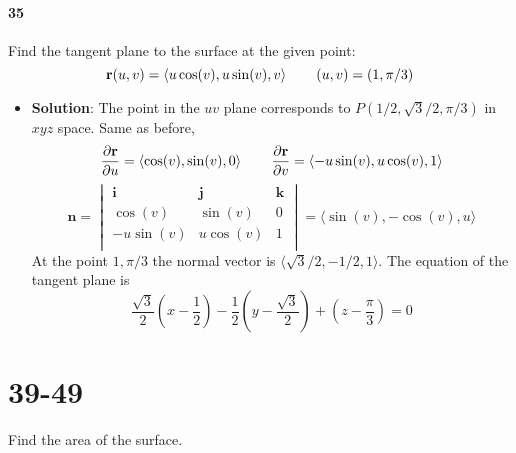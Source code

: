 \documentclass{article}
\newcommand{\parf}[2]{\frac{\partial #1}{\partial #2}}
\begin{document}
    \paragraph{35} Find the tangent plane to the surface at the given point:
    \[ 
        \mathbf{r}(u,v) = \langle u\cos(v), u\sin(v), v \rangle
        \hspace{0.3in} (u,v)=(1,\pi/3)
    \]
    \begin{itemize}
        \item \textbf{Solution}: The point in the $uv$ plane corresponds to $P(1/2, \sqrt{3}/2, \pi/3)$ in $xyz$ space. Same as before,
        \[ \parf{\mathbf{r}}{u} = \langle \cos(v), \sin(v), 0 \rangle \hspace{0.3in} \parf{\mathbf{r}}{v} = \langle -u\sin(v), u\cos(v), 1 \rangle\]
        \[
            \mathbf{n} = 
            \begin{vmatrix}
                \mathbf{i} & \mathbf{j} & \mathbf{k}\\
                \cos(v) & \sin(v) & 0 \\
                -u\sin(v) & u\cos(v) & 1 \\
            \end{vmatrix}
            = \langle \sin(v), -\cos(v), u \rangle
        \]
        At the point $1,\pi/3$ the normal vector is $\langle \sqrt{3}/2, -1/2, 1 \rangle$. The equation of the tangent plane is 
        \[ \frac{\sqrt{3}}{2}(x-\frac{1}{2}) - \frac{1}{2}(y-\frac{\sqrt{3}}{2}) + (z-\frac{\pi}{3}) = 0 \]
    \end{itemize}
    
    \section*{39-49} Find the area of the surface.
\end{document}
